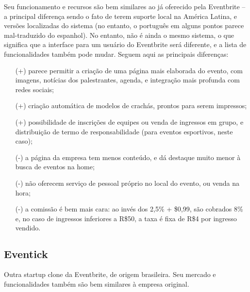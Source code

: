 \documentclass[12pt,a4paper,twoside,hyphens,english,brazil]{abntex2}
\begin{document}
Seu funcionamento e recursos são bem similares ao já oferecido pela Eventbrite -- a principal diferença sendo o fato de terem suporte local na América Latina, e versões localizadas do sistema (no entanto, o português em alguns pontos parece mal-traduzido do espanhol). No entanto, não é ainda o mesmo sistema, o que significa que a interface para um usuário do Eventbrite será diferente, e a lista de funcionalidades também pode mudar. Seguem aqui as principais diferenças:
\begin{itemize}[itemsep=-0.5ex]
	\item[(+)] parece permitir a criação de uma página mais elaborada do evento, com imagens, notícias dos palestrantes, agenda, e integração mais profunda com redes sociais;
	\item[(+)] criação automática de modelos de crachás, prontos para serem impressos;
	\item[(+)] possibilidade de inscrições de equipes ou venda de ingressos em grupo, e distribuição de termo de responsabilidade (para eventos esportivos, neste caso);
	\item[(-)] a página da empresa tem menos conteúdo, e dá destaque muito menor à busca de eventos na home;
	\item[(-)] não oferecem serviço de pessoal próprio no local do evento, ou venda na hora;
	\item[(-)] a comissão é bem mais cara: ao invés dos 2,5\% + \$0,99, são cobrados 8\% e, no caso de ingressos inferiores a R\$50, a taxa é fixa de R\$4 por ingresso vendido.
\end{itemize}

\subsection{Eventick}
Outra startup clone da Eventbrite, de origem brasileira. Seu mercado e funcionalidades também são bem similares à empresa original.
\end{document}
